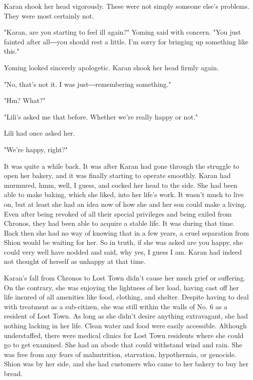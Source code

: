 Karan shook her head vigorously. These were not simply someone else's
problems. They were most certainly not.

"Karan, are you starting to feel ill again?" Yoming said with concern.
"You just fainted after all―you should rest a little. I'm sorry for
bringing up something like this."

Yoming looked sincerely apologetic. Karan shook her head firmly again.

"No, that's not it. I was just―remembering something."

"Hm? What?"

"Lili's asked me that before. Whether we're really happy or not."

Lili had once asked her.

"We're happy, right?"

It was quite a while back. It was after Karan had gone through the
struggle to open her bakery, and it was finally starting to operate
smoothly. Karan had murmured, hmm, well, I guess, and cocked her head to
the side. She had been able to make baking, which she liked, into her
life's work. It wasn't much to live on, but at least she had an idea now
of how she and her son could make a living. Even after being revoked of
all their special privileges and being exiled from Chronos, they had
been able to acquire a stable life. It was during that time. Back then
she had no way of knowing that in a few years, a cruel separation from
Shion would be waiting for her. So in truth, if she was asked are you
happy, she could very well have nodded and said, why yes, I guess I am.
Karan had indeed not thought of herself as unhappy at that time.

Karan's fall from Chronos to Lost Town didn't cause her much grief or
suffering. On the contrary, she was enjoying the lightness of her load,
having cast off her life insured of all amenities like food, clothing,
and shelter. Despite having to deal with treatment as a sub-citizen, she
was still within the walls of No. 6 as a resident of Lost Town. As long
as she didn't desire anything extravagant, she had nothing lacking in
her life. Clean water and food were easily accessible. Although
understaffed, there were medical clinics for Lost Town residents where
she could go to get examined. She had an abode that could withstand wind
and rain. She was free from any fears of malnutrition, starvation,
hypothermia, or genocide. Shion was by her side, and she had customers
who came to her bakery to buy her bread.


